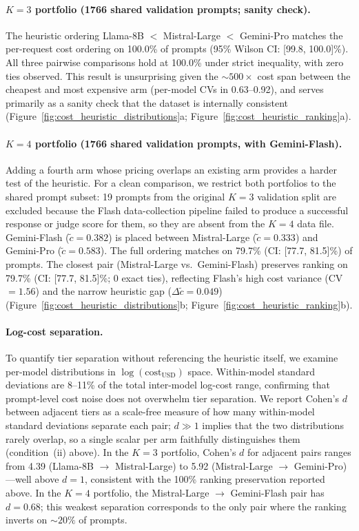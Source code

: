 \paragraph{$K{=}3$ portfolio (1766 shared validation prompts; sanity check).}
The heuristic ordering Llama-8B $<$ Mistral-Large $<$ Gemini-Pro
matches the per-request cost ordering on 100.0\% of prompts
(95\% Wilson CI: [99.8, 100.0]\%).
All three pairwise comparisons hold at 100.0\% under strict
inequality, with zero ties observed.
This result is unsurprising given the ${\sim}500{\times}$ cost span
between the cheapest and most expensive arm (per-model CVs in
0.63--0.92), and serves primarily as a sanity check that the dataset
is internally consistent
(Figure~\ref{fig:cost_heuristic_distributions}a;
Figure~\ref{fig:cost_heuristic_ranking}a).

\paragraph{$K{=}4$ portfolio (1766 shared validation prompts, with Gemini-Flash).}
Adding a fourth arm whose pricing overlaps an existing arm provides a
harder test of the heuristic.
For a clean comparison, we restrict both portfolios to the shared
prompt subset: 19 prompts from the original $K{=}3$ validation split
are excluded because the Flash data-collection pipeline failed to
produce a successful response or judge score for them, so they are
absent from the $K{=}4$ data file.
Gemini-Flash ($\tilde{c} = 0.382$) is placed between Mistral-Large
($\tilde{c} = 0.333$) and Gemini-Pro ($\tilde{c} = 0.583$).
The full ordering matches on 79.7\%
(CI: [77.7, 81.5]\%) of prompts.
The closest pair (Mistral-Large vs.\ Gemini-Flash) preserves ranking
on 79.7\% (CI: [77.7, 81.5]\%; 0 exact ties), reflecting Flash's
high cost variance (CV $= 1.56$) and the narrow heuristic gap
($\Delta\tilde{c} = 0.049$)
(Figure~\ref{fig:cost_heuristic_distributions}b;
Figure~\ref{fig:cost_heuristic_ranking}b).

\paragraph{Log-cost separation.}
To quantify tier separation without referencing the heuristic itself,
we examine per-model distributions in
$\log(\text{cost}_{\text{USD}})$ space.
Within-model standard deviations are 8--11\% of the total inter-model
log-cost range, confirming that prompt-level cost noise does not
overwhelm tier separation.
We report Cohen's $d$ between adjacent tiers as a scale-free measure
of how many within-model standard deviations separate each pair;
$d \gg 1$ implies that the two distributions rarely overlap, so a
single scalar per arm faithfully distinguishes them (condition~(ii)
above).
In the $K{=}3$ portfolio, Cohen's $d$ for adjacent pairs ranges from
4.39 (Llama-8B $\to$ Mistral-Large) to 5.92 (Mistral-Large $\to$
Gemini-Pro)---well above $d{=}1$, consistent with the 100\% ranking
preservation reported above.
In the $K{=}4$ portfolio, the Mistral-Large $\to$ Gemini-Flash pair
has $d = 0.68$; this weakest separation corresponds to the only pair
where the ranking inverts on ${\sim}20\%$ of prompts.

